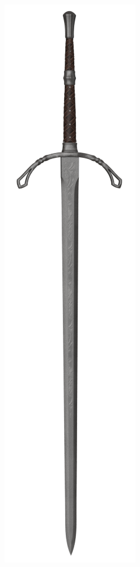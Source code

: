 

\vspace{4em}

\begin{figure}[h]
\begin{center}
\includegraphics[scale=0.27]{img/Longsword.png}
\end{center}
\end{figure}


